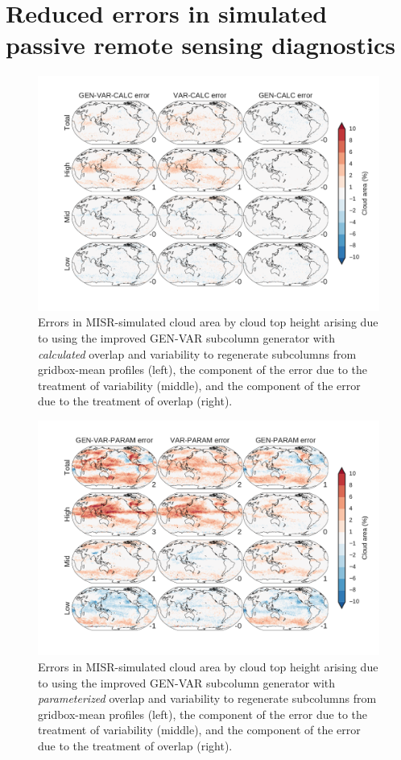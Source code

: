 \section{Reduced errors in simulated passive remote sensing diagnostics}
\label{subgrid2_passive_section}

\begin{figure}
\centering
\includegraphics[width=\columnwidth]{graphics/subgrid2_cldmisr_maps_gen-var-calc_diff.pdf}
\caption{Errors in MISR-simulated cloud area by cloud top height arising due to using the improved GEN-VAR subcolumn generator with \emph{calculated} overlap and variability to regenerate subcolumns from gridbox-mean profiles (left), the component of the error due to the treatment of variability (middle), and the component of the error due to the treatment of overlap (right).}
\label{sgi_cldmisr_maps_gen-var-calc_diff}
\end{figure}

\begin{figure}
\centering
\includegraphics[width=\columnwidth]{graphics/subgrid2_cldmisr_maps_gen-var-param_diff.pdf}
\caption{Errors in MISR-simulated cloud area by cloud top height arising due to using the improved GEN-VAR subcolumn generator with \emph{parameterized} overlap and variability to regenerate subcolumns from gridbox-mean profiles (left), the component of the error due to the treatment of variability (middle), and the component of the error due to the treatment of overlap (right).}
\label{sgi_cldmisr_maps_gen-var-param_diff}
\end{figure}

